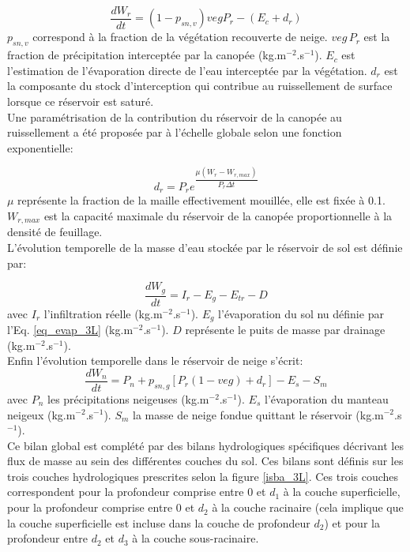 \begin{equation}
\label{eq_waterfx_veg}
\frac{dW_{r}}{dt} = (1-p_{sn,v})vegP_{r}-(E_{c}+d_{r})
\end{equation}
$p_{sn,v}$ correspond à la fraction de la végétation recouverte de neige. $veg\,P_{r}$ est la fraction de précipitation interceptée par la canopée (kg.m$^{-2}$.s$^{-1}$). $E_{c}$ est l'estimation de l'évaporation directe de l'eau interceptée par la végétation. $d_{r}$ est la composante du stock d'interception qui contribue au ruissellement de surface lorsque ce réservoir est saturé.\\

\noindent Une paramétrisation de la contribution du réservoir de la canopée au ruissellement a été proposée par \citet{mahfouf1995} à l'échelle globale selon une fonction exponentielle:

\begin{equation}
d_{r}=P_{r}e^{\dfrac{\mu(W_{r}-W_{r,max})}{P_{r}\Delta t}}
\end{equation}
$\mu$ représente la fraction de la maille effectivement mouillée, elle est fixée à 0.1. $W_{r,max}$ est la capacité maximale du réservoir de la canopée proportionnelle à la densité de feuillage.\\

\noindent L'évolution temporelle de la masse d'eau stockée par le réservoir de sol est définie par:

\begin{equation}
\label{eq_waterfx_sol}
\frac{dW_{g}}{dt} = I_{r} - E_{g} - E_{tr}  - D 
\end{equation}
avec $I_{r}$ l'infiltration réelle (kg.m$^{-2}$.s$^{-1}$). $E_{g}$ l'évaporation du sol nu définie par l'Eq. \ref{eq_evap_3L} (kg.m$^{-2}$.s$^{-1}$). $D$ représente le puits de masse par drainage (kg.m$^{-2}$.s$^{-1}$).\\

\noindent Enfin l'évolution temporelle dans le réservoir de neige s'écrit:
\begin{equation}
\label{eq_waterfx_sn}
 \frac{dW_{n}}{dt}  = P_{n} + p_{sn,g}[ P_{r}(1-veg) + d_{r} ] - E_{s} - S_{m}
\end{equation}
avec $P_{n}$ les précipitations neigeuses (kg.m$^{-2}$.s$^{-1}$). $E_{s}$ l'évaporation du manteau neigeux (kg.m$^{-2}$.s$^{-1}$). $S_{m}$ la masse de neige fondue quittant le réservoir (kg.m$^{-2}$.s$^{-1}$).\\

\noindent Ce bilan global est complété par des bilans hydrologiques spécifiques décrivant les flux de masse au sein des différentes couches du sol. Ces bilans sont définis sur les trois couches hydrologiques prescrites selon la figure \ref{isba_3L}. Ces trois couches correspondent pour la profondeur comprise entre 0 et $d_1$ à la couche superficielle, pour la profondeur comprise entre 0 et $d_2$ à la couche racinaire (cela implique que la couche superficielle est incluse dans la couche de profondeur $d_2$) et pour la profondeur entre $d_2$ et $d_3$ à la couche sous-racinaire. \\

